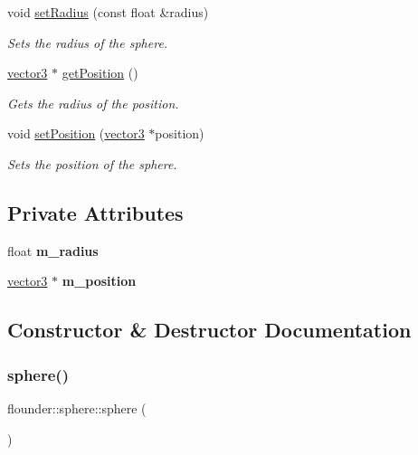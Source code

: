 \begin{DoxyCompactItemize}
void \hyperlink{classflounder_1_1sphere_aa1b5e29fd71de3c0b5f93a548ad9acd7}{set\+Radius} (const float \&radius)
\begin{DoxyCompactList}\small\item\em Sets the radius of the sphere. \end{DoxyCompactList}\item 
\hyperlink{classflounder_1_1vector3}{vector3} $\ast$ \hyperlink{classflounder_1_1sphere_a78dced6f9f51ced09303f21c2a5805ee}{get\+Position} ()
\begin{DoxyCompactList}\small\item\em Gets the radius of the position. \end{DoxyCompactList}\item 
void \hyperlink{classflounder_1_1sphere_aefc59c69374508ea42237e0e9204cf8f}{set\+Position} (\hyperlink{classflounder_1_1vector3}{vector3} $\ast$position)
\begin{DoxyCompactList}\small\item\em Sets the position of the sphere. \end{DoxyCompactList}\end{DoxyCompactItemize}
\subsection*{Private Attributes}
\begin{DoxyCompactItemize}
\item 
\mbox{\label{classflounder_1_1sphere_aac64797b8fe65b438f51d9eedce60df7}} 
float {\bfseries m\+\_\+radius}
\item 
\mbox{\label{classflounder_1_1sphere_ab1f889c31c7f5eb9265fa91feae23a84}} 
\hyperlink{classflounder_1_1vector3}{vector3} $\ast$ {\bfseries m\+\_\+position}
\end{DoxyCompactItemize}


\subsection{Constructor \& Destructor Documentation}
\mbox{\label{classflounder_1_1sphere_a99e656a77996015079eb9744db5d7330}} 
\subsubsection{\texorpdfstring{sphere()}{sphere()}\hspace{0.1cm}{\footnotesize\ttfamily [1/4]}}
{\footnotesize\ttfamily flounder\+::sphere\+::sphere (\begin{DoxyParamCaption}{ }\end{DoxyParamCaption})}



